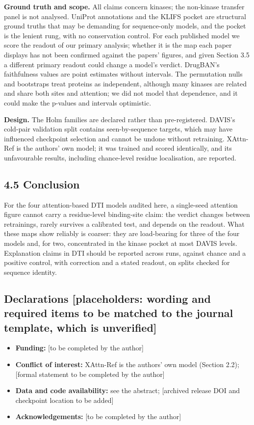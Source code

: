 \textbf{Ground truth and scope.} All claims concern kinases; the non-kinase transfer panel is not analysed. UniProt annotations and the KLIFS pocket are structural ground truths that may be demanding for sequence-only models, and the pocket is the lenient rung, with no conservation control. For each published model we score the readout of our primary analysis; whether it is the map each paper displays has not been confirmed against the papers' figures, and given Section 3.5 a different primary readout could change a model's verdict. DrugBAN's faithfulness values are point estimates without intervals. The permutation nulls and bootstraps treat proteins as independent, although many kinases are related and share both sites and attention; we did not model that dependence, and it could make the p-values and intervals optimistic.

\textbf{Design.} The Holm families are declared rather than pre-registered. DAVIS's cold-pair validation split contains seen-by-sequence targets, which may have influenced checkpoint selection and cannot be undone without retraining. XAttn-Ref is the authors' own model; it was trained and scored identically, and its unfavourable results, including chance-level residue localisation, are reported.

\subsection{4.5 Conclusion}\label{conclusion}

For the four attention-based DTI models audited here, a single-seed attention figure cannot carry a residue-level binding-site claim: the verdict changes between retrainings, rarely survives a calibrated test, and depends on the readout. What these maps show reliably is coarser: they are load-bearing for three of the four models and, for two, concentrated in the kinase pocket at most DAVIS levels. Explanation claims in DTI should be reported across runs, against chance and a positive control, with correction and a stated readout, on splits checked for sequence identity.

\subsection{Declarations {[}placeholders: wording and required items to be matched to the journal template, which is unverified{]}}\label{declarations-placeholders-wording-and-required-items-to-be-matched-to-the-journal-template-which-is-unverified}

\begin{itemize}
\tightlist
\item
  \textbf{Funding:} {[}to be completed by the author{]}
\item
  \textbf{Conflict of interest:} XAttn-Ref is the authors' own model (Section 2.2); {[}formal statement to be completed by the author{]}
\item
  \textbf{Data and code availability:} see the abstract; {[}archived release DOI and checkpoint location to be added{]}
\item
  \textbf{Acknowledgements:} {[}to be completed by the author{]}
\end{itemize}
